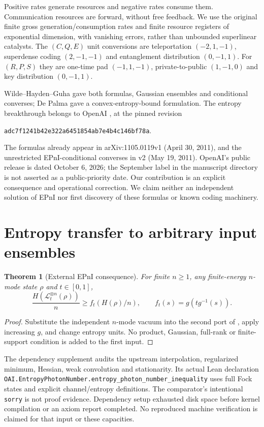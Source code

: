 \documentclass[11pt]{article}
\newtheorem{theorem}{Theorem}
\newcommand{\Loss}{\mathcal L}
\begin{document}
Positive rates generate resources and negative rates consume them.
Communication resources are forward, without free feedback.
We use the original finite gross generation/consumption rates and
finite resource registers of exponential dimension, with vanishing
errors, rather than unbounded superlinear catalysts. The
$(C,Q,E)$ unit conversions are teleportation $(-2,1,-1)$,
superdense coding $(2,-1,-1)$ and entanglement distribution
$(0,-1,1)$. For $(R,P,S)$ they are one-time pad $(-1,1,-1)$,
private-to-public $(1,-1,0)$ and key distribution $(0,-1,1)$.

Wilde--Hayden--Guha \cite{WHG} gave both formulas, Gaussian ensembles
and conditional converses; De Palma \cite[Theorem 11 and Corollary 12]{DP}
gave a convex-entropy-bound formulation. The entropy breakthrough
belongs to OpenAI \cite{OAI}, at the pinned revision
\begin{center}\small\texttt{adc7f1241b42e322a6451854ab7e4b4c146bf78a}.\end{center}
The formulas already appear in arXiv:1105.0119v1 (April 30, 2011),
and the unrestricted EPnI-conditional converses in v2 (May 19, 2011).
OpenAI's public release is dated October 6, 2026; the September label
in the manuscript directory is not asserted as a public-priority date.
Our contribution is an explicit consequence and operational correction.
We claim neither an independent solution of EPnI nor first discovery of
these formulas or known coding machinery.

\section{Entropy transfer to arbitrary input ensembles}
\begin{theorem}[External EPnI consequence]\label{sharp}
For finite $n\ge1$, any finite-energy $n$-mode state $\rho$ and
$t\in[0,1]$,
\[
 \frac{H(\Loss_t^{\otimes n}(\rho))}{n}
 \ge f_t(H(\rho)/n),\qquad f_t(s)=g(tg^{-1}(s)).
\]
\end{theorem}
\begin{proof}
Substitute the independent $n$-mode vacuum into the second port of
\cite[Theorem 1.1]{OAI}, apply increasing $g$, and change entropy
units. No product, Gaussian, full-rank or finite-support condition
is added to the first input.
\end{proof}
The dependency supplement audits the upstream interpolation,
regularized minimum, Hessian, weak convolution and stationarity.
Its actual Lean declaration
\nolinkurl{OAI.EntropyPhotonNumber.entropy_photon_number_inequality}
uses full Fock states and explicit channel/entropy definitions.
The comparator's intentional \texttt{sorry} is not proof evidence.
Dependency setup exhausted disk space before kernel compilation or an
axiom report completed. No reproduced machine verification is claimed
for that input or these capacities.
\end{document}
